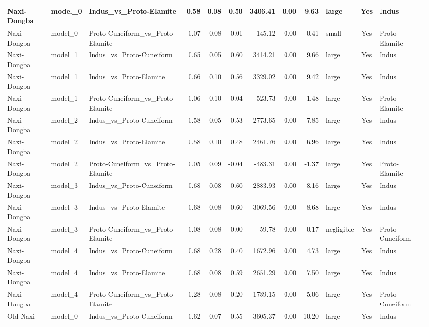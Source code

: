 \documentclass[11pt,a4paper,oneside]{report}
\begin{document}
\begin{landscape}
\begin{scriptsize}
\begin{longtable}{|l|l|l|r|r|r|r|r|r|l|c|l|}
Naxi-Dongba & model\_0 & Indus\_vs\_Proto-Elamite & 0.58 & 0.08 & 0.50 & 3406.41 & 0.00 & 9.63 & large & Yes & Indus \\ \hline
Naxi-Dongba & model\_0 & Proto-Cuneiform\_vs\_Proto-Elamite & 0.07 & 0.08 & -0.01 & -145.12 & 0.00 & -0.41 & small & Yes & Proto-Elamite \\ \hline
Naxi-Dongba & model\_1 & Indus\_vs\_Proto-Cuneiform & 0.65 & 0.05 & 0.60 & 3414.21 & 0.00 & 9.66 & large & Yes & Indus \\ \hline
Naxi-Dongba & model\_1 & Indus\_vs\_Proto-Elamite & 0.66 & 0.10 & 0.56 & 3329.02 & 0.00 & 9.42 & large & Yes & Indus \\ \hline
Naxi-Dongba & model\_1 & Proto-Cuneiform\_vs\_Proto-Elamite & 0.06 & 0.10 & -0.04 & -523.73 & 0.00 & -1.48 & large & Yes & Proto-Elamite \\ \hline
Naxi-Dongba & model\_2 & Indus\_vs\_Proto-Cuneiform & 0.58 & 0.05 & 0.53 & 2773.65 & 0.00 & 7.85 & large & Yes & Indus \\ \hline
Naxi-Dongba & model\_2 & Indus\_vs\_Proto-Elamite & 0.58 & 0.10 & 0.48 & 2461.76 & 0.00 & 6.96 & large & Yes & Indus \\ \hline
Naxi-Dongba & model\_2 & Proto-Cuneiform\_vs\_Proto-Elamite & 0.05 & 0.09 & -0.04 & -483.31 & 0.00 & -1.37 & large & Yes & Proto-Elamite \\ \hline
Naxi-Dongba & model\_3 & Indus\_vs\_Proto-Cuneiform & 0.68 & 0.08 & 0.60 & 2883.93 & 0.00 & 8.16 & large & Yes & Indus \\ \hline
Naxi-Dongba & model\_3 & Indus\_vs\_Proto-Elamite & 0.68 & 0.08 & 0.60 & 3069.56 & 0.00 & 8.68 & large & Yes & Indus \\ \hline
Naxi-Dongba & model\_3 & Proto-Cuneiform\_vs\_Proto-Elamite & 0.08 & 0.08 & 0.00 & 59.78 & 0.00 & 0.17 & negligible & Yes & Proto-Cuneiform \\ \hline
Naxi-Dongba & model\_4 & Indus\_vs\_Proto-Cuneiform & 0.68 & 0.28 & 0.40 & 1672.96 & 0.00 & 4.73 & large & Yes & Indus \\ \hline
Naxi-Dongba & model\_4 & Indus\_vs\_Proto-Elamite & 0.68 & 0.08 & 0.59 & 2651.29 & 0.00 & 7.50 & large & Yes & Indus \\ \hline
Naxi-Dongba & model\_4 & Proto-Cuneiform\_vs\_Proto-Elamite & 0.28 & 0.08 & 0.20 & 1789.15 & 0.00 & 5.06 & large & Yes & Proto-Cuneiform \\ \hline
Old-Naxi & model\_0 & Indus\_vs\_Proto-Cuneiform & 0.62 & 0.07 & 0.55 & 3605.37 & 0.00 & 10.20 & large & Yes & Indus \\ \hline

\end{longtable}
\end{scriptsize}
\end{landscape}
\end{document}
